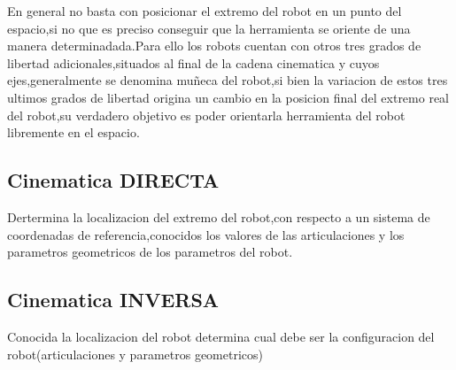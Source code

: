 \documentclass[12pt,a4paper]{article}
\begin{document}
En general no basta con posicionar el extremo del robot en un punto del espacio,si no que es preciso conseguir que la herramienta se oriente de una manera determinadada.Para ello los robots cuentan con otros tres grados de libertad adicionales,situados al final de la cadena cinematica y cuyos ejes,generalmente se denomina muñeca del robot,si bien la variacion de estos tres ultimos grados de libertad origina un cambio en la posicion final del extremo real del robot,su verdadero objetivo es poder orientarla herramienta del robot libremente en el espacio.


\subsection{Cinematica DIRECTA}
Dertermina la localizacion del extremo del robot,con respecto a un sistema de coordenadas de referencia,conocidos los valores de las articulaciones y los parametros geometricos de los parametros del robot.
\subsection{Cinematica INVERSA}
Conocida la localizacion del robot determina cual debe ser la configuracion del robot(articulaciones y parametros geometricos)
\end{document}
